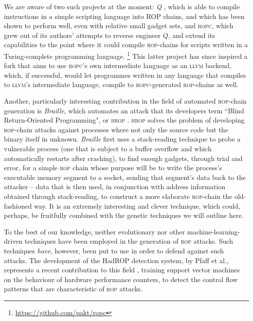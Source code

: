 We are aware of two such projects at the moment:
\emph{Q} \cite{shacham07}, which is able to compile instructions in a simple scripting language into ROP chains, and which has been shown to perform well,
even with relative small gadget sets, and \textsc{ropc}, which grew out of
its authors' attempts to reverse engineer $Q$, and extend its
capabilities to the point where it could compile
\textsc{rop}-chains for scripts written in a Turing-complete
programming language.%
\footnote{\url{https://github.com/pakt/ropc}} This latter project
has since inspired a fork that aims to use \textsc{ropc}'s own
intermediate language as an \textsc{llvm} backend, which, if
successful, would let programmes written in any language that
compiles to \textsc{llvm}'s intermediate language, compile to
\textsc{ropc}-generated \textsc{rop}-chains as well.  

Another, particularly interesting contribution in the field of
automated \textsc{rop}-chain generation is \emph{Braille}, which
automates an attack that its developers term ``Blind
Return-Oriented Programming", or \textsc{brop} \cite{bittau14}.
\textsc{brop} solves the problem of developing \textsc{rop}-chain
attacks against processes where not only the source code but the
binary itself in unknown. %
\emph{Braille} first uses a stack-reading technique to probe a
vulnerable process (one that is subject to a buffer overflow and
which automatically restarts after crashing), to find enough
gadgets, through trial and error, for a simple \textsc{rop} chain
whose purpose will be to write the process's executable memory
segment to a socket, sending that segment's data back to the
attacker -- data that is then used, in conjunction with address
information obtained through stack-reading, to construct a more
elaborate \textsc{rop}-chain the old-fashioned way. It is an
extremely interesting and clever technique, which could, perhaps,
be fruitfully combined with the genetic techniques we will
outline here. 

To the best of our knowledge, neither evolutionary nor other
machine-learning-driven techniques have been employed in the
generation of \textsc{rop} attacks. Such techniques \emph{have},
however, been put to use in order to defend against such attacks.
The development of the HadROP detection system, by Pfaff et
al., represents a recent contribution to this field \cite{pfaff15}, training support
vector machines on the behaviour of hardware performance
counters, to detect the control flow patterns that are
characteristic of \textsc{rop} attacks.  

